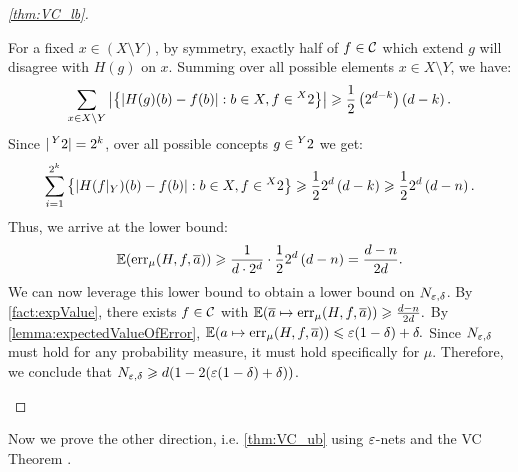 \begin{proof}[\cref{thm:VC_lb}]
\begin{outline}
        \2 For a fixed $x\in(X\setminus Y)$, by symmetry, exactly half of $f\in\mathcal{C}$ which extend $g$ will disagree with $H(g)$ on $x$. 
        Summing over all possible elements $x\in X \setminus Y$, we have:
        \setlength\delimitershortfall{-1pt}
        $$\sum_{x\in X\setminus Y}
        \left|
        \left\{ 
        \left|H(g) (b)-f(b)
        \right|
        : b\in X, f\in\prescript{X}{}{2} 
        \right\}
        \right| 
        \geqslant 
        \frac{1}{2}
        \left(2^{d-k}
        \right)
        \left(d-k
        \right).$$
        \2 Since $|\prescript{Y}{}{2}|=2^k$, over all possible concepts $g\in \prescript{Y}{}{2}$ we get:
        \setlength\delimitershortfall{-1pt}
        $$
        \sum_{i=1}^{2^k}
        \left\{
        \left|
        H(f|_Y)(b) - f(b)
        \right| 
        : b\in X, f\in \prescript{X}{}{2}
        \right\} 
        \geqslant 
        \frac{1}{2}2^d
        \left(d-k
        \right)
        \geqslant 
        \frac{1}{2}2^d
        \left(d-n
        \right).
        $$
        \2 Thus, we arrive at the lower bound:
        $$
        \operatorname{\mathbb{E}}(\operatorname{err}_\mu(H,f,\overline{a}))\geqslant \frac{1}{d\cdot 2^d}\cdot
        \frac{1}{2}2^d
        \left(d-n
        \right)
        =
        \frac{d-n}{2d}.
        $$
    \1 We can now leverage this lower bound to obtain a lower bound on $N_{\varepsilon,\delta}$.   
        \2 By \cref{fact:expValue}, there exists $f\in\mathcal{C}$ with  
        $
        \operatorname{\mathbb{E}}(\overline{a}\mapsto\operatorname{err}_\mu(H,f,\overline{a}))\geqslant\frac{d-n}{2d}.
        $
        \2 By \cref{lemma:expectedValueOfError}, 
        $
        \operatorname{\mathbb{E}}(a\mapsto \operatorname{err}_\mu(H,f,\overline{a})) \leqslant \varepsilon(1-\delta)+\delta.
        $
        \2 Since $N_{\varepsilon,\delta}$ must hold for any probability measure, it must hold specifically for $\mu$. Therefore, we conclude that $N_{\varepsilon,\delta} \geqslant d(1-2(\varepsilon(1-\delta)+\delta))$.
\end{outline}
\end{proof}

Now we prove the other direction, i.e. \cref{thm:VC_ub} using $\varepsilon$-nets and the VC Theorem .

